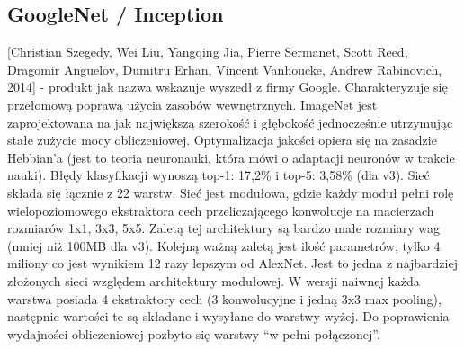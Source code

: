 \documentclass[12pt,a4paper,twoside,titlepage,openright]{book}
\begin{document}
\subsection{GoogleNet / Inception}
[Christian Szegedy, Wei Liu, Yangqing Jia, Pierre Sermanet, Scott Reed, Dragomir Anguelov, Dumitru Erhan, Vincent Vanhoucke, Andrew Rabinovich, 2014] - produkt jak nazwa wskazuje wyszedł z firmy Google. Charakteryzuje się przełomową poprawą użycia zasobów wewnętrznych. ImageNet jest zaprojektowana na jak największą szerokość i głębokość jednocześnie utrzymując stałe zużycie mocy obliczeniowej. Optymalizacja jakości opiera się na zasadzie Hebbian’a (jest to teoria neuronauki, która mówi o adaptacji neuronów w trakcie nauki). Błędy klasyfikacji wynoszą top-1: 17,2\% i top-5: 3,58\% (dla v3). Sieć składa się łącznie z 22 warstw. Sieć jest modułowa, gdzie każdy moduł pełni rolę wielopoziomowego ekstraktora cech przeliczającego konwolucje na macierzach rozmiarów 1x1, 3x3, 5x5. Zaletą tej architektury są bardzo małe rozmiary wag (mniej niż 100MB dla v3). Kolejną ważną zaletą jest ilość parametrów, tylko 4 miliony co jest wynikiem 12 razy lepszym od AlexNet. Jest to jedna z najbardziej złożonych sieci względem architektury modułowej. W wersji naiwnej każda warstwa posiada 4 ekstraktory cech (3 konwolucyjne i jedną 3x3 max pooling), następnie wartości te są składane i wysyłane do warstwy wyżej. Do poprawienia wydajności obliczeniowej pozbyto się warstwy “w pełni połączonej”. \cite{DBLP:journals/corr/SzegedyLJSRAEVR14}
\end{document}
